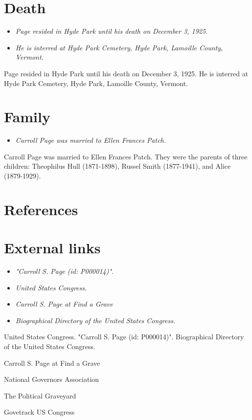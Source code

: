 \section{Death}\label{death}

\begin{itemize}
\item
  \emph{Page resided in Hyde Park until his death on December 3, 1925.}
\item
  \emph{He is interred at Hyde Park Cemetery, Hyde Park, Lamoille
  County, Vermont.}
\end{itemize}

Page resided in Hyde Park until his death on December 3, 1925. He is
interred at Hyde Park Cemetery, Hyde Park, Lamoille County, Vermont.

\section{Family}\label{family}

\begin{itemize}
\item
  \emph{Carroll Page was married to Ellen Frances Patch.}
\end{itemize}

Carroll Page was married to Ellen Frances Patch. They were the parents
of three children: Theophilus Hull (1871-1898), Russel Smith
(1877-1941), and Alice (1879-1929).

\section{References}\label{references}

\section{External links}\label{external-links}

\begin{itemize}
\item
  \emph{"Carroll S. Page (id: P000014)".}
\item
  \emph{United States Congress.}
\item
  \emph{Carroll S. Page at Find a Grave}
\item
  \emph{Biographical Directory of the United States Congress.}
\end{itemize}

United States Congress. "Carroll S. Page (id: P000014)". Biographical
Directory of the United States Congress.

Carroll S. Page at Find a Grave

National Governors Association

The Political Graveyard

Govetrack US Congress
